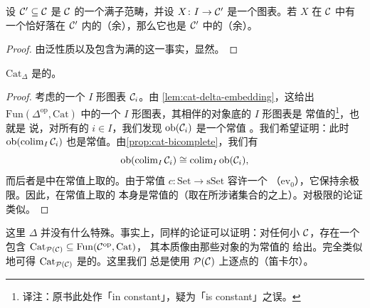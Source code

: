 \begin{lemma}\label{lem:full-subcategory-colimit}
设 $\mathcal{C}' \subseteq \mathcal{C}$ 是\trCategory{} $\mathcal{C}$ 的一个满子范畴，并设 $X\colon I \to \mathcal{C}'$
是一个图表。若 $X$ 在 $\mathcal{C}$ 中有一个恰好落在 $\mathcal{C}'$ 内的（余）\trLimit{}，那么它也是
$\mathcal{C}'$ 中的（余）\trLimit{}。
\end{lemma}

\begin{proof}
由泛性质以及包含为满的这一事实，显然。
\end{proof}

\begin{corollary}\label{cor:cat-delta-bicomplete}
\trCategory{} $\mathrm{Cat}_{\Delta}$ 是\trBicomplete{}的。
\end{corollary}

\begin{proof}
考虑\trSimplicialCategory{}的一个 $I$ 形图表 $\mathcal{C}_i$。由%
\cref{lem:cat-delta-embedding}，这给出 $\mathrm{Fun}(\Delta^{\mathrm{op}}, \mathrm{Cat})$ 中的一个 $I$ 形图表，其相伴的对象底\trSimplicialSets{}的 $I$ 形图表是
常值的\footnote{译注：原书此处作「in constant」，疑为「is constant」之误。}，也就是
说，对所有的 $i \in I$，我们发现 $\mathrm{ob}(\mathcal{C}_i)$ 是一个常值%
\trSimplicialSet{}。我们希望证明：此时 $\mathrm{ob}(\operatorname{colim}_I \mathcal{C}_i)$
也是常值\trSimplicialSet{}。由\cref{prop:cat-bicomplete}，我们有
\[
\mathrm{ob}(\operatorname{colim}_I \mathcal{C}_i) \cong
\operatorname{colim}_I \mathrm{ob}(\mathcal{C}_i),
\]
而后者是\trSimplicialSets{}中在常值\trSimplicialSets{}上取的\trColimit{}。由于常值\trFunctor{} $c\colon \mathrm{Set} \to \mathrm{sSet}$ 容许一个\trRightAdjoint{}%
（$\mathrm{ev}_0$），它保持余极限。因此，在常值\trSimplicialSets{}上取的\trColimit{}%
本身是常值的（取在所涉诸集合的\trColimit{}之上）。对极限的论证类似。
\end{proof}

\begin{remark}\label{rem:cat-pc-bicomplete}
这里 $\Delta$ 并没有什么特殊。事实上，同样的论证可以证明：对任何小\trCategory{}%
$\mathcal{C}$，存在一个\trFullyFaithful{}包含
$\mathrm{Cat}_{\mathcal{P}(\mathcal{C})} \subseteq \mathrm{Fun}(\mathcal{C}^{\mathrm{op}}, \mathrm{Cat})$，
其本质像由那些对象的\trPresheaf{}为常值的\trFunctor{}%
给出。完全类似地可得 $\mathrm{Cat}_{\mathcal{P}(\mathcal{C})}$ 是\trBicomplete{}的。这里我们
总是使用 $\mathcal{P}(\mathcal{C})$ 上逐点的（笛卡尔）\trMonoidalStructure{}。
\end{remark}

